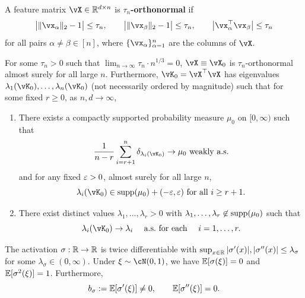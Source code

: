 \begin{defi}\label{def:ortho}
A feature matrix $\vX\in\R^{d\times n}$ is {\bf $\tau_n$-orthonormal} if
\[\big|\|\vx_{\alpha}\|_2-1\big| \leq \tau_n,
\qquad \big|\|\vx_{\beta}\|_2-1\big| \leq \tau_n,
\qquad \big|\vx_{\alpha}^\top \vx_{\beta}\big| \leq \tau_n\]
for all pairs $\alpha\neq \beta\in [n]$, where
$\{\vx_{\alpha}\}_{\alpha=1}^n$ are the columns of $\vX$.
\end{defi}

\begin{assumption}\label{assump:data}
For some $\tau_n>0$ such that $\lim_{n \to \infty} \tau_n \cdot n^{1/3}=0$,
$\vX \equiv \vX_0$ is $\tau_n$-orthonormal almost surely for all large $n$.
Furthermore, $\vK_0=\vX^\top \vX$ has eigenvalues
$\lambda_1(\vK_0),\ldots,\lambda_n(\vK_0)$
(not necessarily ordered by magnitude) such that
for some fixed $r \geq 0$, as $n,d \to \infty$,
\begin{enumerate}[label=(\alph*)]
\item There exists a compactly supported probability measure $\mu_0 $ on $[0,\infty)$ 
such that
$$\frac{1}{n-r}\sum_{i=r+1}^n \delta_{\lambda_i(\vK_0)} \to \mu_0
\text{ weakly a.s.}$$ 
and for any fixed $\varepsilon>0$, almost surely for all large $n$,
\[\lambda_i(\vK_0) \in \supp{\mu_0}+(-\eps,\eps) \text{ for all }
i \geq r+1.\]   
\item  There exist distinct values $\lambda_1,\ldots,\lambda_r>0$ with
$\lambda_1,\ldots,\lambda_r \not\in\mathrm{supp}({\mu_0})$ such that
\[\lambda_i(\vK_0) \to \lambda_i\quad \text{ a.s.\ for each }\quad  i=1,\ldots,r.\]
\end{enumerate}
\end{assumption}

\begin{assumption}\label{assump:sigma}
The activation $\sigma:\mathbb{R} \to \mathbb{R}$ is twice differentiable with
$\sup_{x \in \mathbb{R}} |\sigma'(x)|,|\sigma''(x)| \leq \lambda_\sigma$
for some $\lambda_\sigma\in (0,\infty)$.
Under $\xi \sim \cN(0,1)$, we have
$\mathbb{E}[\sigma(\xi)]=0$ and $\mathbb{E}[\sigma^2(\xi)]=1$.
Furthermore,
\begin{equation}\label{eq:conditionsigma}
b_\sigma:=\mathbb{E}[\sigma'(\xi)] \neq 0, \qquad
\mathbb{E}[\sigma''(\xi)]=0.
\end{equation}
\end{assumption}

